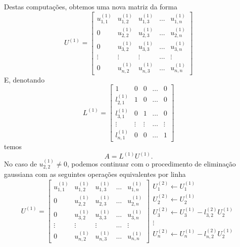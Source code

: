 Destas computações, obtemos uma nova matriz da forma
\begin{equation}
  U^{(1)} = \begin{bmatrix}
    u_{1,1}^{(1)} & u_{1,2}^{(1)} & u_{1,3}^{(1)} & \ldots & u_{1,n}^{(1)} \\
    0 & u_{2,2}^{(1)} & u_{2,3}^{(1)} & \ldots & u_{2,n}^{(1)} \\
    0 & u_{3,2}^{(1)} & u_{3,3}^{(1)} & \ldots & u_{3,n}^{(1)} \\
    \vdots & \vdots & \vdots & \ldots & \vdots \\
    0 & u_{n,2}^{(1)} & u_{n,3}^{(1)} & \ldots & u_{n,n}^{(1)}
  \end{bmatrix}  
\end{equation}
E, denotando
\begin{equation}
  L^{(1)} =
  \begin{bmatrix}
    1 & 0 & 0 & \ldots & 0\\
    l_{2,1}^{(1)} & 1 & 0 & \ldots & 0\\
    l_{3,1}^{(1)} & 0 & 1 & \ldots & 0\\
    \vdots & \vdots & \vdots & \ldots & \vdots\\
    l_{n,1}^{(1)} & 0 & 0 & \ldots & 1
  \end{bmatrix}
\end{equation}
temos
\begin{equation}
  A = L^{(1)}U^{(1)}.
\end{equation}
No caso de $u^{(1)}_{2,2}\neq 0$, podemos continuar com o procedimento de eliminação gaussiana com as seguintes operações equivalentes por linha
\begin{equation}
  U^{(1)} = \begin{bmatrix}
    u_{1,1}^{(1)} & u_{1,2}^{(1)} & u_{1,3}^{(1)} & \ldots & u_{1,n}^{(1)} \\
    0 & u_{2,2}^{(1)} & u_{2,3}^{(1)} & \ldots & u_{2,n}^{(1)} \\
    0 & u_{3,2}^{(1)} & u_{3,3}^{(1)} & \ldots & u_{3,n}^{(1)} \\
    \vdots & \vdots & \vdots & \ldots & \vdots \\
    0 & u_{n,2}^{(1)} & u_{n,3}^{(1)} & \ldots & u_{n,n}^{(1)}
  \end{bmatrix}  
  \begin{array}{l}
    U_1^{(2)}\leftarrow U_1^{(1)}\\
    U_2^{(2)}\leftarrow U_2^{(1)}\\
    U_3^{(2)} \leftarrow U_3^{(1)} - l_{3,2}^{(2)}U_2^{(1)}\\
    \vdots\\
    U_n^{(2)} \leftarrow U_n^{(1)} - l_{n,2}^{(2)}U_2^{(1)}\\
  \end{array}
\end{equation}

